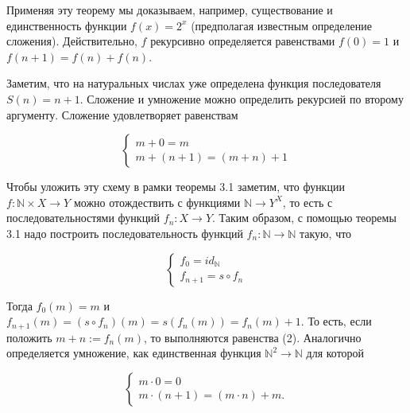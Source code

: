 Применяя эту теорему мы доказываем, например, существование и единственность функции $f(x) = 2^x$ (предполагая
известным определение сложения). Действительно, $f$ рекурсивно определяется равенствами $f(0) = 1$ и $ f(n+1) =
f(n) + f(n)$.

Заметим, что на натуральных числах уже определена функция последователя $S(n) = n+1$. Сложение и умножение можно
определить рекурсией по второму аргументу. Сложение удовлетворяет равенствам

\begin{equation}
	\left\{\begin{array}{l}
		{m + 0 = m} \\
		{m + (n + 1) = (m + n) + 1}
	\end{array}\right.
\end{equation}

Чтобы уложить эту схему в рамки теоремы 3.1 заметим, что функции $f : \mathbb{N} \times X \rightarrow Y$ можно
отождествить с функциями $\mathbb{N} \rightarrow Y^X$, то есть с
последовательностями функций $f_n : X \rightarrow Y$. Таким образом, с помощью
теоремы 3.1 надо построить последовательность функций $f_n : \mathbb{N} \rightarrow \mathbb{N}$ такую, что

\begin{equation}
	\left\{\begin{array}{l}
		{f_0 = id_\mathbb{N}} \\
		{f_{n+1} = s \circ f_n}
	\end{array}\right.
\end{equation}

Тогда $f_0 (m) = m$ и $f_{n+1} (m) = (s \circ f_n) (m) = s(f_n (m)) = f_n (m) + 1$. То есть, если положить $m+n :=
f_n (m)$, то выполняются равенства (2).
Аналогично определяется умножение, как единственная функция $\mathbb{N}^2 \rightarrow \mathbb{N}$ для которой

\begin{equation}
	\left\{\begin{array}{l}
		{m \cdot 0 = 0} \\
		{m \cdot (n+1) = (m \cdot n) + m}.
	\end{array}\right.
\end{equation}
